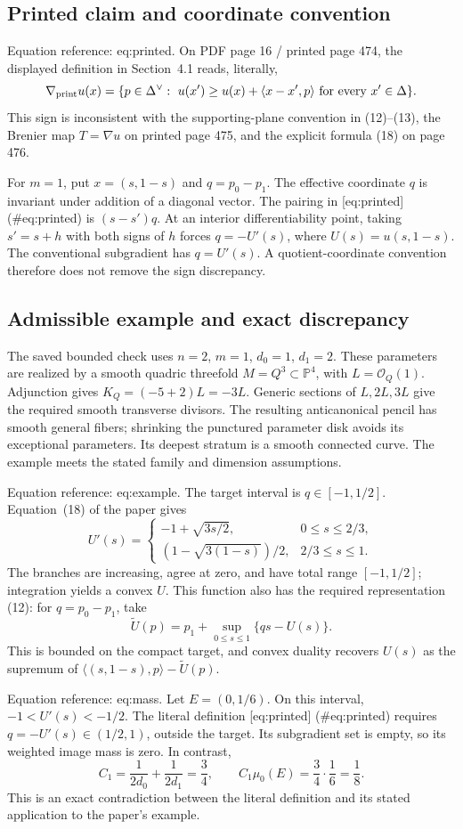 \documentclass[10pt]{article}
\begin{document}
\subsection*{Printed claim and coordinate convention}
Equation reference: eq:printed. On PDF page 16 / printed page 474, the displayed definition in Section 4.1 reads, literally, \[
 \nabla_{\rm print}u(x)=
 \{p\in\Delta^\vee:\ u(x')\geq u(x)+\langle x-x',p\rangle
       \ \hbox{for every }x'\in\Delta\}.\] This sign is inconsistent with the supporting-plane convention in (12)–(13), the Brenier map \(T=\nabla u\) on printed page 475, and the explicit formula (18) on page 476.\par
For \(m=1\), put \(x=(s,1-s)\) and \(q=p_0-p_1\). The effective coordinate \(q\) is invariant under addition of a diagonal vector. The pairing in [eq:printed] (\#eq:printed) is \((s-s')q\). At an interior differentiability point, taking \(s'=s+h\) with both signs of \(h\) forces \(q=-U'(s)\), where \(U(s)=u(s,1-s)\). The conventional subgradient has \(q=U'(s)\). A quotient-coordinate convention therefore does not remove the sign discrepancy.\par
\subsection*{Admissible example and exact discrepancy}
The saved bounded check uses \(n=2\), \(m=1\), \(d_0=1\), \(d_1=2\). These parameters are realized by a smooth quadric threefold \(M=Q^3\subset\mathbb P^4\), with \(L=\mathcal O_Q(1)\). Adjunction gives \(K_Q=(-5+2)L=-3L\). Generic sections of \(L,2L,3L\) give the required smooth transverse divisors. The resulting anticanonical pencil has smooth general fibers; shrinking the punctured parameter disk avoids its exceptional parameters. Its deepest stratum is a smooth connected curve. The example meets the stated family and dimension assumptions.\par
Equation reference: eq:example. The target interval is \(q\in[-1,1/2]\). Equation (18) of the paper gives \[
 U'(s)=
 \begin{cases}
 -1+\sqrt{3s/2},&0\leq s\leq2/3,\\[2pt]
 (1-\sqrt{3(1-s)})/2,&2/3\leq s\leq1.
 \end{cases}\] The branches are increasing, agree at zero, and have total range \([-1,1/2]\); integration yields a convex \(U\). This function also has the required representation (12): for \(q=p_0-p_1\), take \[\widetilde U(p)=p_1+\sup_{0\leq s\leq1}\{qs-U(s)\}.\] This is bounded on the compact target, and convex duality recovers \(U(s)\) as the supremum of \(\langle(s,1-s),p\rangle-\widetilde U(p)\).\par
Equation reference: eq:mass. Let \(E=(0,1/6)\). On this interval, \(-1<U'(s)<-1/2\). The literal definition [eq:printed] (\#eq:printed) requires \(q=-U'(s)\in(1/2,1)\), outside the target. Its subgradient set is empty, so its weighted image mass is zero. In contrast, \[
 C_1=\frac{1}{2d_0}+\frac{1}{2d_1}=\frac34,\qquad
 C_1\mu_0(E)=\frac34\cdot\frac16=\frac18.\] This is an exact contradiction between the literal definition and its stated application to the paper’s example.\par
\end{document}
